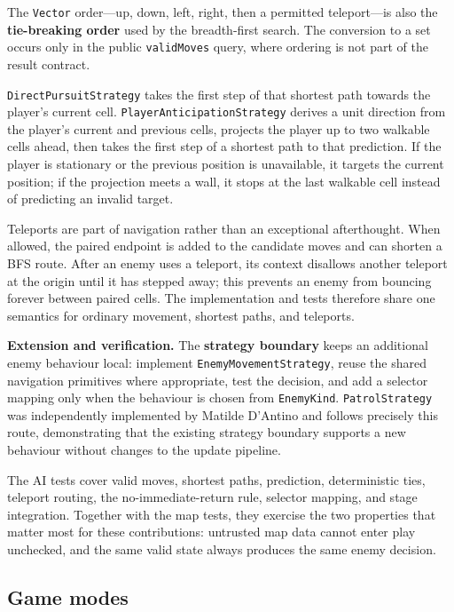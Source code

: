 The \texttt{Vector} order---up, down, left, right, then a permitted teleport---is also the \textbf{tie-breaking order} used by
the breadth-first search. The conversion to a set occurs only in the public \texttt{validMoves} query, where ordering
is not part of the result contract.

\texttt{DirectPursuitStrategy} takes the first step of that shortest path towards the player's current cell.
\texttt{PlayerAnticipationStrategy} derives a unit direction from the player's current and previous cells, projects
the player up to two walkable cells ahead, then takes the first step of a shortest path to that prediction. If the
player is stationary or the previous position is unavailable, it targets the current position; if the projection meets
a wall, it stops at the last walkable cell instead of predicting an invalid target.

Teleports are part of navigation rather than an exceptional afterthought. When allowed, the paired endpoint is added
to the candidate moves and can shorten a BFS route. After an enemy uses a teleport, its context disallows another
teleport at the origin until it has stepped away; this prevents an enemy from bouncing forever between paired cells.
The implementation and tests therefore share one semantics for ordinary movement, shortest paths, and teleports.

\textbf{Extension and verification.} The \textbf{strategy boundary} keeps an additional enemy behaviour local: implement \texttt{EnemyMovementStrategy}, reuse the
shared navigation primitives where appropriate, test the decision, and add a selector mapping only when the behaviour
is chosen from \texttt{EnemyKind}. \texttt{PatrolStrategy} was independently implemented by Matilde D'Antino and follows
precisely this route, demonstrating that the existing strategy boundary supports a new behaviour without changes to
the update pipeline.

The AI tests cover valid moves, shortest paths, prediction, deterministic ties, teleport routing, the
no-immediate-return rule, selector mapping, and stage integration. Together with the map tests, they exercise the two properties
that matter most for these contributions: untrusted map data cannot enter play unchecked, and the same valid state
always produces the same enemy decision.

\subsection{Game modes}

